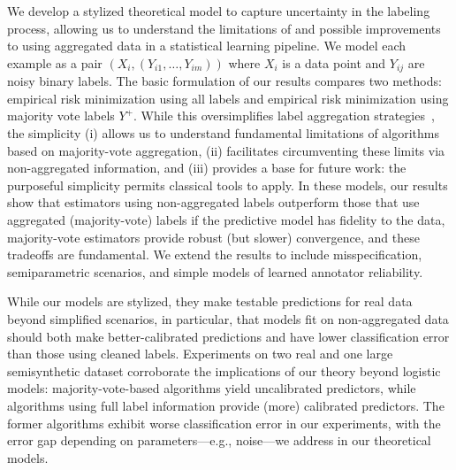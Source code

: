 \documentclass[11pt]{article}
\newcommand{\majY}{Y^+}
\newcommand{\<}{\langle} %
\renewcommand{\>}{\rangle}
\begin{document}

We develop a stylized theoretical model to capture uncertainty in the
labeling process, allowing us to understand the limitations of and possible
improvements to using aggregated data in a statistical learning pipeline.
%
We model each example as a pair $(X_i, (Y_{i1},\dots,Y_{im}))$ where $X_i$
is a data point and $Y_{ij}$ are noisy binary labels.
%
The basic
formulation of our results compares two methods: empirical risk
minimization using all labels and empirical risk minimization using
majority vote labels $\majY$.
%
While this oversimplifies label
aggregation strategies~\cite{DawidSk79, RussakovskyDeSuKrSaMaHuKaKhBeBeFe15,
  RatnerBaEhFrWuRe17},
the simplicity (i) allows us to understand
fundamental limitations of algorithms based on majority-vote aggregation,
(ii) facilitates circumventing these limits via non-aggregated
information, and (iii) provides a base for future work: the purposeful
simplicity permits classical tools to apply.
%
In these models, our results show that estimators using non-aggregated labels
outperform those that use aggregated (majority-vote)
labels if the predictive model has fidelity to the data,
majority-vote estimators provide robust (but slower) convergence, and these
tradeoffs are fundamental.
%
We extend the results to include misspecification, semiparametric
scenarios, and simple models of learned annotator reliability.

While our models are stylized, they make testable predictions for real data
beyond simplified scenarios, in particular, that models fit on
non-aggregated data should both make better-calibrated predictions and have
lower classification error than those using cleaned labels.
%
Experiments on two real and one large semisynthetic dataset corroborate the
implications of our theory beyond logistic models: majority-vote-based
algorithms yield uncalibrated predictors, while algorithms using full label
information provide (more) calibrated predictors.
%
The former algorithms exhibit worse classification error in our experiments,
with the error gap depending on parameters---e.g.,
noise---we address in our theoretical models.
 
\end{document}
